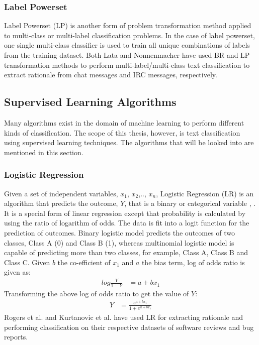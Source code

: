 \documentclass[a4paper,12pt,twoside]{report}
\begin{document}
\subsubsection{Label Powerset} 
Label Powerset (\acs{LP}) is another form of problem transformation method applied to multi-class or multi-label classification problems. In the case of label powerset, one single multi-class classifier is used to train all unique combinations of labels from the training dataset.
\newline \newline
Both Lata \cite{Lata2016} and Nonnenmacher\cite{Nonnenmacher2017} have used \acs{BR} and \acs{LP} transformation methods to perform multi-label/multi-class text classification to extract rationale from chat messages and \acs{IRC} messages, respectively. 

\subsection{Supervised Learning Algorithms}
Many algorithms exist in the domain of machine learning to perform different kinds of classification. The scope of this thesis, however, is text classification using supervised learning techniques. The algorithms that will be looked into are mentioned in this section.

\subsubsection{Logistic Regression}
Given a set of independent variables, $x_1$, $x_2$,.., $x_n$, Logistic Regression (\acs{LR}) is an algorithm that predicts the outcome, $Y$, that is a binary or categorical variable \cite{Peng2002}, \cite{Strombergsson2009} . It is a special form of linear regression except that probability is calculated by using the ratio of logarithm of odds. The data is fit into a logit function for the prediction of outcomes. Binary logistic model predicts the outcomes of two classes, Class A (0) and Class B (1), whereas multinomial logistic model is capable of predicting more than two classes, for example, Class A, Class B and Class C\cite{Jurafsky2017}. 
\newline \newline
Given $b$ the co-efficient of $x_1$ and $a$ the bias term, log of odds ratio is given as:
\begin{align*}
log\frac{Y}{1-Y} &= a + bx_1
\end{align*}
\newline \newline
Transforming the above log of odds ratio to get the value of $Y$:
\begin{align*}
Y &=  \frac{e^{a + bx_1}}{1 + e^{a + bx_1}}
\end{align*}
\newline \newline
Rogers et al.\cite{Rogers2012} and Kurtanovic et al.\cite{Kurtanovic2017} have used \acs{LR} for extracting rationale and performing classification on their respective datasets of software reviews and bug reports. 
\end{document}
